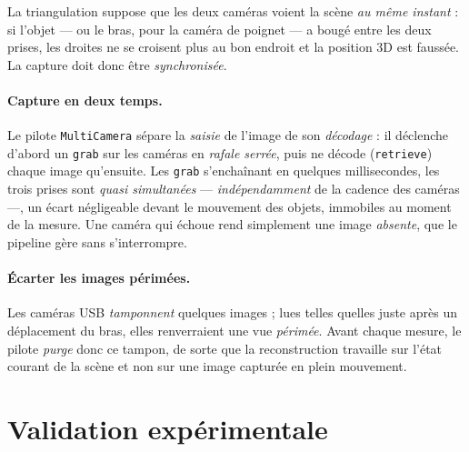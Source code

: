 La triangulation suppose que les deux caméras voient la scène \emph{au même instant} : si l'objet --- ou le bras, pour la caméra de poignet --- a bougé entre les deux prises, les droites ne se croisent plus au bon endroit et la position 3D est faussée. La capture doit donc être \emph{synchronisée}.

\paragraph{Capture en deux temps.} Le pilote \texttt{MultiCamera} sépare la \emph{saisie} de l'image de son \emph{décodage} : il déclenche d'abord un \texttt{grab} sur les caméras en \emph{rafale serrée}, puis ne décode (\texttt{retrieve}) chaque image qu'ensuite. Les \texttt{grab} s'enchaînant en quelques millisecondes, les trois prises sont \emph{quasi simultanées} --- \emph{indépendamment} de la cadence des caméras ---, un écart négligeable devant le mouvement des objets, immobiles au moment de la mesure. Une caméra qui échoue rend simplement une image \emph{absente}, que le pipeline gère sans s'interrompre.

\paragraph{Écarter les images périmées.} Les caméras USB \emph{tamponnent} quelques images ; lues telles quelles juste après un déplacement du bras, elles renverraient une vue \emph{périmée}. Avant chaque mesure, le pilote \emph{purge} donc ce tampon, de sorte que la reconstruction travaille sur l'état courant de la scène et non sur une image capturée en plein mouvement.


\section{Validation expérimentale}
\label{sec:perception-valid}

